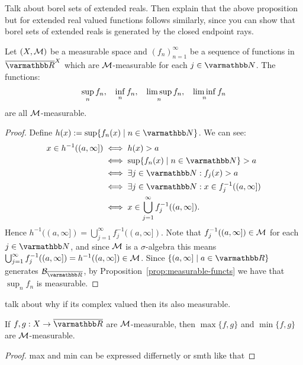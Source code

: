 {\color{red} Talk about borel sets of extended reals. Then explain that the above proposition but for extended real valued functions follows similarly, since you can show that borel sets of extended reals is generated by the closed endpoint rays.}

\newpage
\begin{proposition}\label{prop:limits-of-measurable-functions-are-measurable}
    Let $(X,\cM)$ be a measurable space and $(f_n)_{n = 1}^\infty$ be a sequence of functions in $\overline{\bfR}^X$ which are $\cM$-measurable for each $j \in \bfN$. The functions:
        \begin{equation*}
        \begin{split}
            \sup_n f_n, \h9 \inf_n f_n, \h9 \limsup_n f_n, \h9\liminf_n f_n
        \end{split}
        \end{equation*}
    are all $\cM$-measurable.
\end{proposition}
    \begin{proof}
        Define $h(x) := \sup\{f_n(x) \mid n \in \bfN\}$. We can see:
            \begin{equation*}
            \begin{split}
                x \in h^{-1}((a,\infty])
                & \iff h(x) > a \\
                & \iff \sup\{f_n(x) \mid n \in \bfN\} > a \\
                & \iff \exists j \in \bfN : f_j(x) > a \\
                & \iff \exists j \in \bfN : x \in f_j^{-1}((a,\infty]) \\
                & \iff x \in \bigcup_{j = 1}^\infty f_j^{-1}((a,\infty]).
            \end{split}
            \end{equation*}
        Hence $h^{-1}((a,\infty]) = \bigcup_{j = 1}^\infty f_j^{-1}((a,\infty])$. Note that $f_j^{-1}((a,\infty]) \in \cM$ for each $j \in \bfN$, and since $\cM$ is a $\sigma$-algebra this means $\bigcup_{j = 1}^\infty f_j^{-1}((a,\infty]) = h^{-1}((a,\infty])\in \cM$. Since $\{(a,\infty] \mid a \in \bfR\}$ generates $\cB_{\overline{\bfR}}$, by Proposition~\ref{prop:measurable-functs} we have that $\sup_n f_n$ is measurable.
    \end{proof}
\newpage
{\color{red} talk about why if its complex valued then its also measurable.}

\begin{proposition}
    If $f,g:X \rightarrow \overline{\bfR}$ are $\cM$-measurable, then $\max\{f,g\}$ and $\min\{f,g\}$ are $\cM$-measurable.
\end{proposition}
    {\color{red} \begin{proof}
        max and min can be expressed differnetly or smth like that
    \end{proof}}

